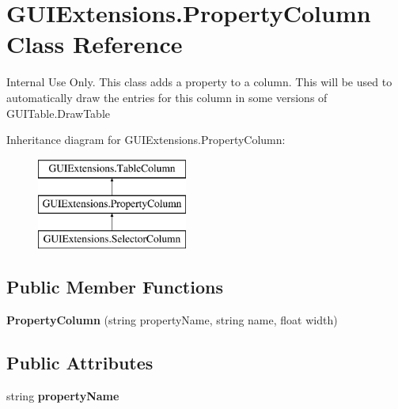 \hypertarget{class_g_u_i_extensions_1_1_property_column}{}\section{G\+U\+I\+Extensions.\+Property\+Column Class Reference}
\label{class_g_u_i_extensions_1_1_property_column}


Internal Use Only. This class adds a property to a column. This will be used to automatically draw the entries for this column in some versions of G\+U\+I\+Table.\+Draw\+Table  


Inheritance diagram for G\+U\+I\+Extensions.\+Property\+Column\+:\begin{figure}[H]
\begin{center}
\leavevmode
\includegraphics[height=3.000000cm]{class_g_u_i_extensions_1_1_property_column}
\end{center}
\end{figure}
\subsection*{Public Member Functions}
\begin{DoxyCompactItemize}
\item 
\mbox{\label{class_g_u_i_extensions_1_1_property_column_a9e5b8655054132f351926de205a3f2aa}} 
{\bfseries Property\+Column} (string property\+Name, string name, float width)
\end{DoxyCompactItemize}
\subsection*{Public Attributes}
\begin{DoxyCompactItemize}
\item 
\mbox{\label{class_g_u_i_extensions_1_1_property_column_afd70f617ed70ba8f14747115e5b957ec}} 
string {\bfseries property\+Name}
\end{DoxyCompactItemize}
